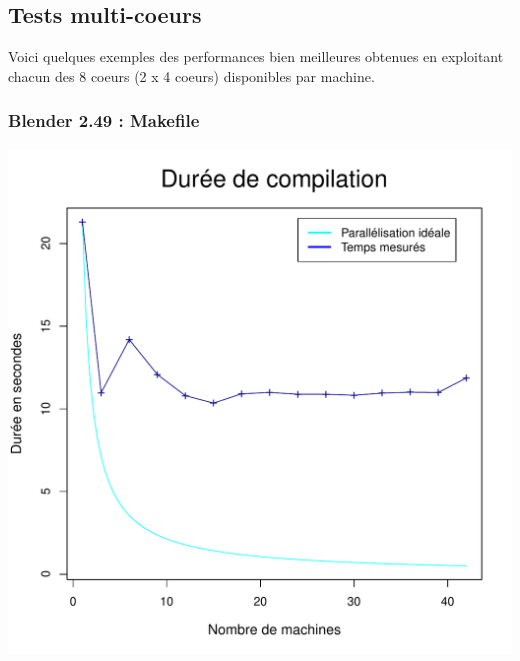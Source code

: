 \documentclass[a4paper, 11pt, titlepage]{article}
\begin{document}
\newpage

\subsection {Tests multi-coeurs}

Voici quelques exemples des performances bien meilleures obtenues en exploitant chacun des 8 coeurs (2 x 4 coeurs) disponibles par machine.

\subsubsection {Blender 2.49 : Makefile}

\begin{center}
    \includegraphics[scale=0.45]{res/sujet_makefiles_blender_249_Makefile_nth8.pdf}

\end{center}
\end{document}

